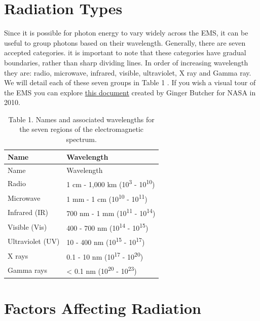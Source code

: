 \documentclass[
]{book}
\begin{document}
\hypertarget{radiation-types}{%
\section{Radiation Types}\label{radiation-types}}

Since it is possible for photon energy to vary widely across the
EMS, it can be useful to group photons based on their wavelength.
Generally, there are seven accepted categories. it is important to note
that these categories have gradual boundaries, rather than sharp
dividing lines. In order of increasing wavelength they are: radio,
microwave, infrared, visible, ultraviolet, X ray and Gamma ray. We will
detail each of these seven groups in Table 1 \citep{zwinkels2020}. If you
wish a visual tour of the EMS you can explore \href{https://books.google.ca/books?id=DfLPpxogdM4C\&pg=PP1\#v=onepage\&q\&f=false}{this
document}
created by Ginger Butcher for NASA in 2010.

\begin{longtable}[]{@{}ll@{}}
\caption{Table 1. Names and associated wavelengths for the seven regions of the
electromagnetic spectrum.}\tabularnewline
\toprule
Name & Wavelength \\
\midrule
\endfirsthead
\toprule
Name & Wavelength \\
\midrule
\endhead
Radio & 1 cm - 1,000 km (10\textsuperscript{3} - 10\textsuperscript{10}) \\
Microwave & 1 mm - 1 cm (10\textsuperscript{10} - 10\textsuperscript{11}) \\
Infrared (IR) & 700 nm - 1 mm (10\textsuperscript{11} - 10\textsuperscript{14}) \\
Visible (Vis) & 400 - 700 nm (10\textsuperscript{14} - 10\textsuperscript{15}) \\
Ultraviolet (UV) & 10 - 400 nm (10\textsuperscript{15} - 10\textsuperscript{17}) \\
X rays & 0.1 - 10 nm (10\textsuperscript{17} - 10\textsuperscript{20}) \\
Gamma rays & \textless{} 0.1 nm (10\textsuperscript{20} - 10\textsuperscript{23}) \\
\bottomrule
\end{longtable}

\hypertarget{factors-affecting-radiation}{%
\section{Factors Affecting Radiation}\label{factors-affecting-radiation}}
\end{document}
